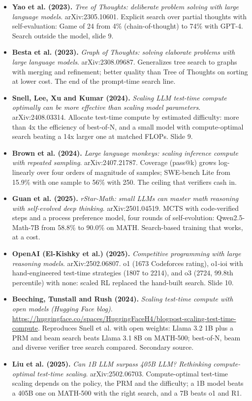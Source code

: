 \begin{itemize}[leftmargin=1.2em,itemsep=3pt]
\item \textbf{Yao et al. (2023).} \textit{Tree of Thoughts: deliberate problem solving with large language models}. arXiv:2305.10601. Explicit search over partial thoughts with self-evaluation: Game of 24 from 4\% (chain-of-thought) to 74\% with GPT-4. Search outside the model, slide 9.
\item \textbf{Besta et al. (2023).} \textit{Graph of Thoughts: solving elaborate problems with large language models}. arXiv:2308.09687. Generalizes tree search to graphs with merging and refinement; better quality than Tree of Thoughts on sorting at lower cost. The end of the prompt-time search line.
\item \textbf{Snell, Lee, Xu and Kumar (2024).} \textit{Scaling LLM test-time compute optimally can be more effective than scaling model parameters}. arXiv:2408.03314. Allocate test-time compute by estimated difficulty: more than 4x the efficiency of best-of-N, and a small model with compute-optimal search beating a 14x larger one at matched FLOPs. Slide 9.
\item \textbf{Brown et al. (2024).} \textit{Large language monkeys: scaling inference compute with repeated sampling}. arXiv:2407.21787. Coverage (pass@k) grows log-linearly over four orders of magnitude of samples; SWE-bench Lite from 15.9\% with one sample to 56\% with 250. The ceiling that verifiers cash in.
\item \textbf{Guan et al. (2025).} \textit{rStar-Math: small LLMs can master math reasoning with self-evolved deep thinking}. arXiv:2501.04519. MCTS with code-verified steps and a process preference model, four rounds of self-evolution: Qwen2.5-Math-7B from 58.8\% to 90.0\% on MATH. Search-based training that works, at a cost.
\item \textbf{OpenAI (El-Kishky et al.) (2025).} \textit{Competitive programming with large reasoning models}. arXiv:2502.06807. o1 (1673 Codeforces rating), o1-ioi with hand-engineered test-time strategies (1807 to 2214), and o3 (2724, 99.8th percentile) with none: scaled RL replaced the hand-built search. Slide 10.
\item \textbf{Beeching, Tunstall and Rush (2024).} \textit{Scaling test-time compute with open models (Hugging Face blog)}. \url{https://huggingface.co/spaces/HuggingFaceH4/blogpost-scaling-test-time-compute}. Reproduces Snell et al. with open weights: Llama 3.2 1B plus a PRM and beam search beats Llama 3.1 8B on MATH-500; best-of-N, beam and diverse verifier tree search compared. Secondary source.
\item \textbf{Liu et al. (2025).} \textit{Can 1B LLM surpass 405B LLM? Rethinking compute-optimal test-time scaling}. arXiv:2502.06703. Compute-optimal test-time scaling depends on the policy, the PRM and the difficulty; a 1B model beats a 405B one on MATH-500 with the right search, and a 7B beats o1 and R1.

\end{itemize}
